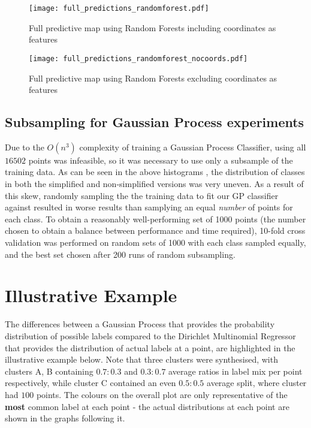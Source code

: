 \begin{figure}[H]
    \begin{minipage}{.49\linewidth}
        \texttt{[image: full\_predictions\_randomforest.pdf]}
        \caption{Full predictive map using Random Forests including coordinates as features}
        \label{fig:rf_w_coords_preds}
    \end{minipage}
    \hfill
    \begin{minipage}{.49\linewidth}
        \texttt{[image: full\_predictions\_randomforest\_nocoords.pdf]}
        \caption{Full predictive map using Random Forests excluding coordinates as features}
        \label{fig:rf_wo_coords_preds}
    \end{minipage}
\end{figure}


\subsection{Subsampling for Gaussian Process experiments}

Due to the $O(n^3)$ complexity of training a Gaussian Process Classifier, using all $16502$ points was infeasible, so it was necessary to use only a subsample of the training data. As can be seen in the above histograms , the distribution of classes in both the simplified and non-simplified versions was very uneven. As a result of this skew, randomly sampling the the training data to fit our GP classifier against resulted in worse results than samplying an equal \textit{number} of points for each class. To obtain a reasonably well-performing set of 1000 points (the number chosen to obtain a balance between performance and time required), 10-fold cross validation was performed on random sets of 1000 with each class sampled equally, and the best set chosen after 200 runs of random subsampling.

\section{Illustrative Example}

The differences between a Gaussian Process that provides the probability distribution of possible labels compared to the Dirichlet Multinomial Regressor that provides the distribution of actual labels at a point, are highlighted in the illustrative example below. Note that three clusters were synthesised, with clusters A, B containing $0.7:0.3$ and $0.3:0.7$ average ratios in label mix per point respectively, while cluster C contained an even $0.5:0.5$ average split, where cluster had $100$ points. The colours on the overall plot are only representative of the \textbf{most} common label at each point - the actual distributions at each point are shown in the graphs following it.

